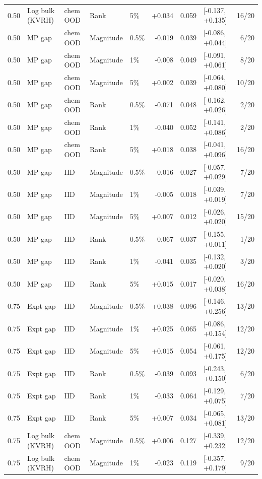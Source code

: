 \begin{longtable}{@{}lllllrrlr@{}}
0.50 & Log bulk (KVRH) & chem OOD & Rank & 5\% & +0.034 & 0.059 & [-0.137, +0.135] & 16/20 \\
0.50 & MP gap & chem OOD & Magnitude & 0.5\% & -0.019 & 0.039 & [-0.086, +0.044] & 6/20 \\
0.50 & MP gap & chem OOD & Magnitude & 1\% & -0.008 & 0.049 & [-0.091, +0.061] & 8/20 \\
0.50 & MP gap & chem OOD & Magnitude & 5\% & +0.002 & 0.039 & [-0.064, +0.080] & 10/20 \\
0.50 & MP gap & chem OOD & Rank & 0.5\% & -0.071 & 0.048 & [-0.162, +0.026] & 2/20 \\
0.50 & MP gap & chem OOD & Rank & 1\% & -0.040 & 0.052 & [-0.141, +0.086] & 2/20 \\
0.50 & MP gap & chem OOD & Rank & 5\% & +0.018 & 0.038 & [-0.041, +0.096] & 16/20 \\
0.50 & MP gap & IID & Magnitude & 0.5\% & -0.016 & 0.027 & [-0.057, +0.029] & 7/20 \\
0.50 & MP gap & IID & Magnitude & 1\% & -0.005 & 0.018 & [-0.039, +0.019] & 7/20 \\
0.50 & MP gap & IID & Magnitude & 5\% & +0.007 & 0.012 & [-0.026, +0.020] & 15/20 \\
0.50 & MP gap & IID & Rank & 0.5\% & -0.067 & 0.037 & [-0.155, +0.011] & 1/20 \\
0.50 & MP gap & IID & Rank & 1\% & -0.041 & 0.035 & [-0.132, +0.020] & 3/20 \\
0.50 & MP gap & IID & Rank & 5\% & +0.015 & 0.017 & [-0.020, +0.038] & 16/20 \\
0.75 & Expt gap & IID & Magnitude & 0.5\% & +0.038 & 0.096 & [-0.146, +0.256] & 13/20 \\
0.75 & Expt gap & IID & Magnitude & 1\% & +0.025 & 0.065 & [-0.086, +0.154] & 12/20 \\
0.75 & Expt gap & IID & Magnitude & 5\% & +0.015 & 0.054 & [-0.061, +0.175] & 12/20 \\
0.75 & Expt gap & IID & Rank & 0.5\% & -0.039 & 0.093 & [-0.243, +0.150] & 6/20 \\
0.75 & Expt gap & IID & Rank & 1\% & -0.033 & 0.064 & [-0.129, +0.075] & 7/20 \\
0.75 & Expt gap & IID & Rank & 5\% & +0.007 & 0.034 & [-0.065, +0.081] & 13/20 \\
0.75 & Log bulk (KVRH) & chem OOD & Magnitude & 0.5\% & +0.006 & 0.127 & [-0.339, +0.232] & 12/20 \\
0.75 & Log bulk (KVRH) & chem OOD & Magnitude & 1\% & -0.023 & 0.119 & [-0.357, +0.179] & 9/20 \\

\end{longtable}

